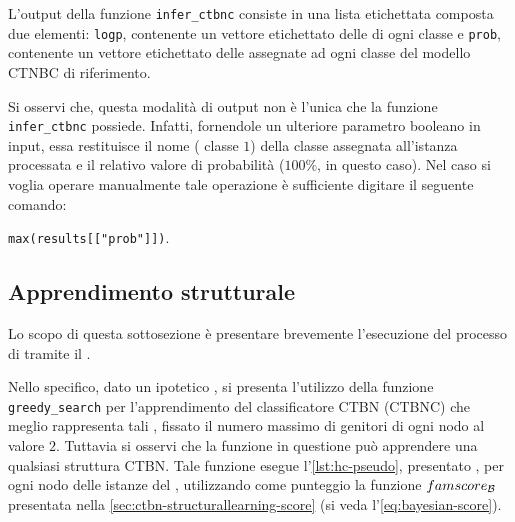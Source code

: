 L'output della funzione \lstinline[language=rstats]{infer_ctbnc} consiste in una lista etichettata composta due elementi: \lstinline$logp$, contenente un vettore etichettato delle \emph{} di ogni classe e \lstinline$prob$, contenente un vettore etichettato delle \emph{} assegnate ad ogni classe del modello \acs{CTNBC} di riferimento.

\vspace*{8pt}\vspace*{8pt}

Si osservi che, questa modalità di output non è l'unica che la funzione \lstinline[language=rstats]{infer_ctbnc} possiede. Infatti, fornendole un ulteriore parametro booleano in input, essa restituisce il nome (\ie{} classe $1$) della classe assegnata all'istanza processata e il relativo valore di probabilità ($100\%$, in questo caso). Nel caso si voglia operare manualmente tale operazione è sufficiente digitare il seguente comando:

\lstinline[language=rstats]{max(results[["prob"]])}.

\subsection{Apprendimento strutturale}
Lo scopo di questa sottosezione è presentare brevemente l'esecuzione del processo di \emph{} tramite il \pacchettor{}.

Nello specifico, dato un ipotetico \emph{}, si presenta l'utilizzo della funzione \lstinline[language=rstats]{greedy_search} per l'apprendimento del classificatore \acs{CTBN} (\acs{CTBNC}) che meglio rappresenta tali , fissato il numero massimo di genitori di ogni nodo al valore $2$. Tuttavia si osservi che la funzione in questione può apprendere una qualsiasi struttura \acs{CTBN}. Tale funzione esegue l'\autoref{lst:hc-pseudo}, presentato , per ogni nodo delle istanze del \emph{}, utilizzando come punteggio la funzione $famscore_{\mathcal{B}}$ presentata nella \vref{sec:ctbn-structurallearning-score} (si veda l'\autoref{eq:bayesian-score}).

